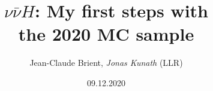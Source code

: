 \documentclass[10pt, aspectratio=169]{beamer}
\title[ILD Analysis/Software Meeting]
  {\texorpdfstring{{$\nu\bar{\nu}H$}}{vvH}: My first steps with\\the 2020 MC sample}
      [vvH: DBD vs MC2020]
\author[Jonas Kunath]{Jean-Claude Brient, \emph{Jonas Kunath} (LLR)}
\date{09.12.2020}%
\begin{document}
  \maketitle
  \handoutline %
  
  
  
  
  
\end{document}
